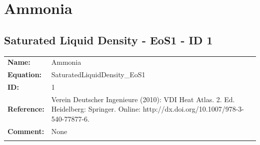 \section{Ammonia}
%
\subsection{Saturated Liquid Density - EoS1 - ID 1}
%
\begin{tabular}[l]{|lp{11.5cm}|}
\hline
\addlinespace

\textbf{Name:} & Ammonia \\
\textbf{Equation:} & SaturatedLiquidDensity\_EoS1 \\
\textbf{ID:} & 1 \\
\textbf{Reference:} & Verein Deutscher Ingenieure (2010): VDI Heat Atlas. 2. Ed. Heidelberg: Springer. Online: http://dx.doi.org/10.1007/978-3-540-77877-6. \\
\textbf{Comment:} & None \\

\addlinespace
\hline
\end{tabular}
\newline


